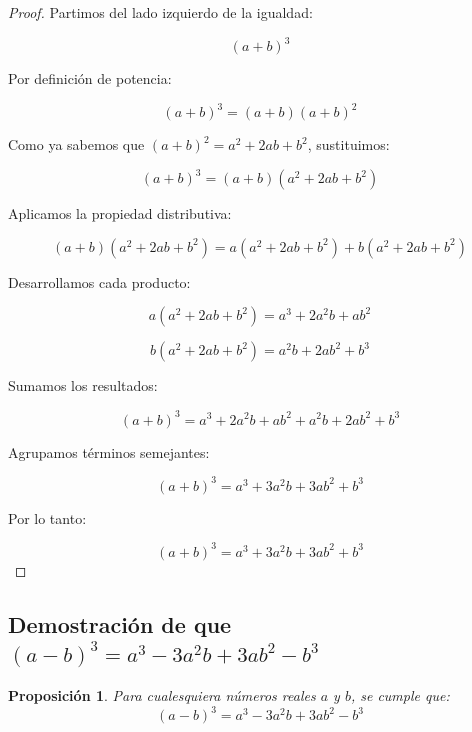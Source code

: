 \documentclass[12pt,final]{report}
\theoremstyle{plain}
\newtheorem{proposition}[theorem]{Proposición}
\theoremstyle{definition}
\begin{document}
\begin{proof}

Partimos del lado izquierdo de la igualdad:

\[
(a+b)^3
\]

Por definición de potencia:

\[
(a+b)^3=(a+b)(a+b)^2
\]

Como ya sabemos que $(a+b)^2=a^2+2ab+b^2$, sustituimos:

\[
(a+b)^3=(a+b)(a^2+2ab+b^2)
\]

Aplicamos la propiedad distributiva:

\[
(a+b)(a^2+2ab+b^2)=a(a^2+2ab+b^2)+b(a^2+2ab+b^2)
\]

Desarrollamos cada producto:

\[
a(a^2+2ab+b^2)=a^3+2a^2b+ab^2
\]

\[
b(a^2+2ab+b^2)=a^2b+2ab^2+b^3
\]

Sumamos los resultados:

\[
(a+b)^3=a^3+2a^2b+ab^2+a^2b+2ab^2+b^3
\]

Agrupamos términos semejantes:

\[
(a+b)^3=a^3+3a^2b+3ab^2+b^3
\]

Por lo tanto:

\[
(a+b)^3=a^3+3a^2b+3ab^2+b^3
\]

\end{proof}

\newpage

\subsection{Demostración de que $(a-b)^3=a^3-3a^2b+3ab^2-b^3$}

\begin{proposition}
Para cualesquiera números reales $a$ y $b$, se cumple que:
\[
(a-b)^3=a^3-3a^2b+3ab^2-b^3
\]
\end{proposition}
\end{document}
